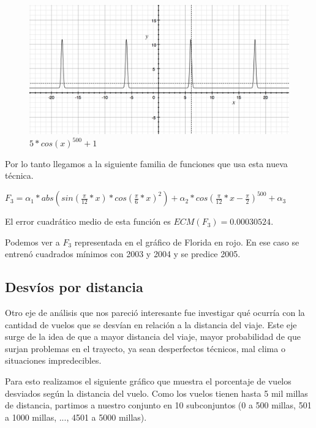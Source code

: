 \begin{figure}[h!]
  \begin{center}
	\includegraphics[scale=0.4]{img/cos500.png}
	\caption{$5*cos(x)^{500} + 1$}
  \end{center}
\end{figure}

Por lo tanto llegamos a la siguiente familia de funciones que usa esta nueva t\'ecnica.

$F_3 = \alpha_1 * abs(sin(\frac{\pi}{12}*x) * cos(\frac{\pi}{6}*x)^2) + \alpha_2 * cos(\frac{\pi}{12}*x - \frac{\pi}{2})^{500} + \alpha_3$

El error cuadr\'atico medio de esta funci\'on es $ECM(F_3) = 0.00030524$.

Podemos ver a $F_3$ representada en el gr\'afico de Florida en rojo. En ese caso se entren\'o cuadrados m\'inimos con 2003 y 2004 y se predice 2005.

\subsection{Desv\'ios por distancia}

Otro eje de análisis que nos pareció interesante fue investigar qué ocurría con la cantidad de vuelos que se desvían en relación a la distancia del viaje. Este eje surge de la idea de que a mayor distancia del viaje, mayor probabilidad de que surjan problemas en el trayecto, ya sean desperfectos técnicos, mal clima o situaciones impredecibles.

Para esto realizamos el siguiente gráfico que muestra el porcentaje de vuelos desviados según la distancia del vuelo. Como los vuelos tienen hasta 5 mil millas de distancia, partimos a nuestro conjunto en 10 subconjuntos (0 a 500 millas, 501 a 1000 millas, ..., 4501 a 5000 millas).

